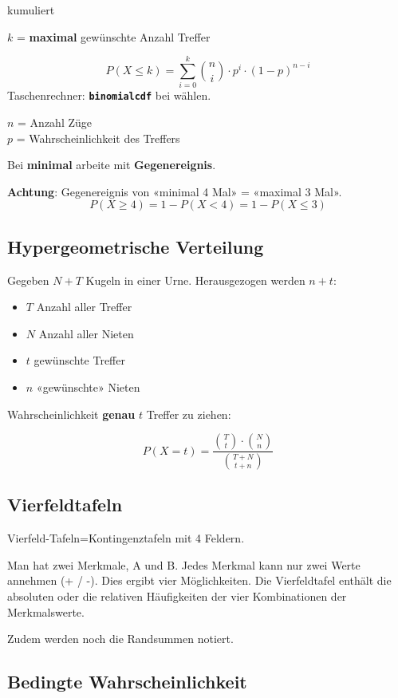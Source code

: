 \begin{multicols}{2}
\begin{gesetz*}{kumuliert}{}

$k$ = \textbf{maximal} gewünschte Anzahl Treffer


$$P(X\le k) = \sum_{i=0}^{k}{n \choose i}\cdot{}p^i\cdot{}(1-p)^{n-i}$$
Taschenrechner: \textbf{\texttt{binomialcdf}} bei  wählen.

$n$ = Anzahl Züge\\
$p$ = Wahrscheinlichkeit des Treffers\\
\end{gesetz*}
Bei \textbf{minimal} arbeite mit \textbf{Gegenereignis}.

\textbf{Achtung}: Gegenereignis von «minimal 4 Mal» = «maximal 3 Mal».
$$P(X \ge 4) = 1 - P(X < 4) = 1-P(X\le 3)$$


\subsection*{Hypergeometrische Verteilung}
Gegeben $N+T$ Kugeln in einer Urne. Herausgezogen werden $n+t$:
\begin{itemize}
\item $T$ Anzahl aller Treffer
\item $N$ Anzahl aller Nieten
\item $t$ gewünschte Treffer
\item $n$ «gewünschte» Nieten
\end{itemize}
Wahrscheinlichkeit \textbf{genau} $t$ Treffer zu ziehen:

$$P(X=t) = \frac{ {T \choose t} \cdot {N  \choose n} }{{T+N \choose t+n}}$$


\subsection*{Vierfeldtafeln}
Vierfeld-Tafeln=Kontingenztafeln mit 4 Feldern.

Man hat zwei Merkmale, A und B. Jedes Merkmal kann nur zwei Werte
annehmen (+ / -). Dies ergibt vier Möglichkeiten. Die Vierfeldtafel
enthält die absoluten oder die relativen Häufigkeiten der vier
Kombinationen der Merkmalswerte.

Zudem werden noch die Randsummen notiert.


\subsection*{Bedingte Wahrscheinlichkeit}


\end{multicols}

